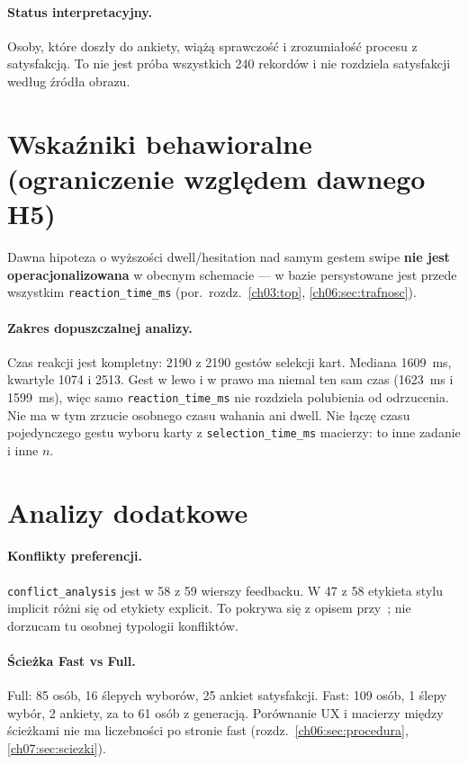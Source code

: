 \paragraph{Status interpretacyjny.}
Osoby, które doszły do ankiety, wiążą sprawczość i zrozumiałość procesu z satysfakcją. To nie jest próba wszystkich 240 rekordów i nie rozdziela satysfakcji według źródła obrazu.

\section{Wskaźniki behawioralne (ograniczenie względem dawnego H5)}
\label{ch08:sec:behavioral}

Dawna hipoteza o wyższości dwell/hesitation nad samym gestem swipe \textbf{nie jest operacjonalizowana} w obecnym schemacie --- w bazie persystowane jest przede wszystkim \texttt{reaction\_time\_ms} (por.\ rozdz.~\ref{ch03:top}, \ref{ch06:sec:trafnosc}).

\paragraph{Zakres dopuszczalnej analizy.}
Czas reakcji jest kompletny: 2190 z 2190 gestów selekcji kart. Mediana 1609~ms, kwartyle 1074 i 2513. Gest w lewo i w prawo ma niemal ten sam czas (1623~ms i 1599~ms), więc samo \texttt{reaction\_time\_ms} nie rozdziela polubienia od odrzucenia. Nie ma w tym zrzucie osobnego czasu wahania ani dwell. Nie łączę czasu pojedynczego gestu wyboru karty z \texttt{selection\_time\_ms} macierzy: to inne zadanie i inne $n$.

\section{Analizy dodatkowe}
\label{ch08:sec:dodatkowe}

\paragraph{Konflikty preferencji.}
\texttt{conflict\_analysis} jest w 58 z 59 wierszy feedbacku. W 47 z 58 etykieta stylu implicit różni się od etykiety explicit. To pokrywa się z opisem przy~; nie dorzucam tu osobnej typologii konfliktów.

\paragraph{Ścieżka Fast vs Full.}
Full: 85 osób, 16 ślepych wyborów, 25 ankiet satysfakcji. Fast: 109 osób, 1 ślepy wybór, 2 ankiety, za to 61 osób z generacją. Porównanie UX i macierzy między ścieżkami nie ma liczebności po stronie fast (rozdz.~\ref{ch06:sec:procedura}, \ref{ch07:sec:sciezki}).

